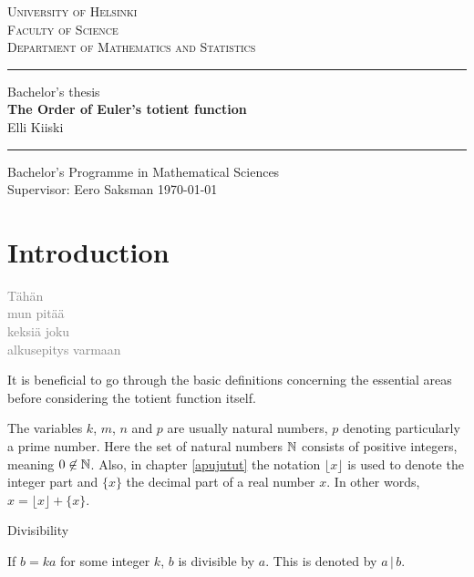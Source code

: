 \documentclass{article}
\begin{document}
\begin{titlepage}
\setlength{\parindent}{0mm}
\Large
\textsc{University of Helsinki \\
Faculty of Science\\
Department of Mathematics and Statistics}
\vspace{5mm}
\hrule height2pt

\begin{center}
\vfill
\Large Bachelor's thesis  \\
\vspace{3mm}
\huge 
\textbf{The Order of Euler's totient function}\\
\vspace{3mm}
\Large Elli Kiiski
\vfill
\end{center}

\hrule height2pt
\vspace{5mm}
Bachelor's Programme in Mathematical Sciences \\[2mm]
Supervisor: Eero Saksman
\hfill
\today
\end{titlepage}

\tableofcontents
\thispagestyle{empty}
\clearpage

\section{Introduction}

\textcolor{gray}{Tähän\\mun pitää\\keksiä joku\\alkusepitys varmaan}

It is beneficial to go through the basic definitions concerning the essential areas before considering the totient function itself.

The variables $k$, $m$, $n$ and $p$ are usually natural numbers, $p$ denoting particularly a prime number. Here the set of natural numbers $\mathbb{N}$ consists of positive integers, meaning $0 \not\in \mathbb{N}$. Also, in chapter \ref{apujutut} the notation $\lfloor x\rfloor$ is used to denote the integer part and $\{x\}$ the decimal part of a real number $x$. In other words, $x=\lfloor x\rfloor+\{x\}$.

\begin{definition}
Divisibility

If $b=ka$ for some integer $k$, $b$ is divisible by $a$. This is denoted by $a \,\vert\, b$.

\end{definition}
\end{document}
